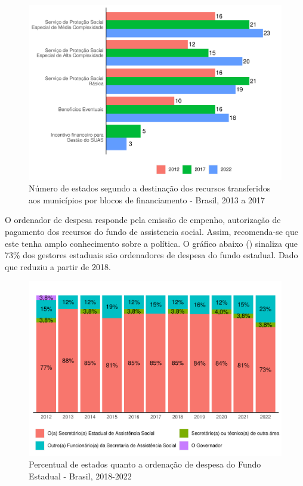 \documentclass[
  brazilian]{report}
\begin{document}
\begin{figure}
\includegraphics{Censo-SUAS-2022_files/figure-latex/estados-blocos-recursos-1} \caption[Número de estados segundo a destinação dos recursos transferidos aos municípios por blocos de financiamento - Brasil, 2013 a 2017]{Número de estados segundo a destinação dos recursos transferidos aos municípios por blocos de financiamento - Brasil, 2013 a 2017}\label{fig:estados-blocos-recursos}
\end{figure}

O ordenador de despesa responde pela emissão de empenho, autorização de
pagamento dos recursos do fundo de assistencia social. Assim,
recomenda-se que este tenha amplo conhecimento sobre a política. O
gráfico abaixo () sinaliza que 73\% dos
gestores estaduais são ordenadores de despesa do fundo estadual. Dado
que reduziu a partir de 2018.

\begin{figure}
\includegraphics{Censo-SUAS-2022_files/figure-latex/estado_ord_despesa-1} \caption[Percentual de estados quanto a ordenação de despesa do Fundo Estadual - Brasil, 2018-2022]{Percentual de estados quanto a ordenação de despesa do Fundo Estadual - Brasil, 2018-2022}\label{fig:estado_ord_despesa}
\end{figure}
\end{document}
